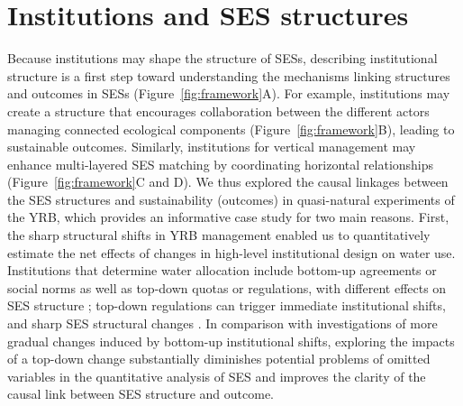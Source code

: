 \section{Institutions and SES structures}
Because institutions may shape the structure of SESs, describing institutional structure is a first step toward understanding the mechanisms linking structures and outcomes in SESs (Figure~\ref{fig:framework}A).
For example, institutions may create a structure that encourages collaboration between the different actors managing connected ecological components (Figure~\ref{fig:framework}B), leading to sustainable outcomes.
Similarly, institutions for vertical management may enhance multi-layered SES matching by coordinating horizontal relationships (Figure~\ref{fig:framework}C and D).
We thus explored the causal linkages between the SES structures and sustainability (outcomes) in quasi-natural experiments of the YRB, which provides an informative case study for two main reasons.
First, the sharp structural shifts in YRB management enabled us to quantitatively estimate the net effects of changes in high-level institutional design on water use. Institutions that determine water allocation include bottom-up agreements or social norms as well as top-down quotas or regulations, with different effects on SES structure \cite{wangAlignmentsocialecological2019,speedBasinwaterallocation2013}; top-down regulations can trigger immediate institutional shifts, and sharp SES structural changes \cite{speedBasinwaterallocation2013,rolandUnderstandinginstitutionalchange2004}.
In comparison with investigations of more gradual changes induced by bottom-up institutional shifts, exploring the impacts of a top-down change substantially diminishes potential problems of omitted variables in the quantitative analysis of SES and improves the clarity of the causal link between SES structure and outcome.
